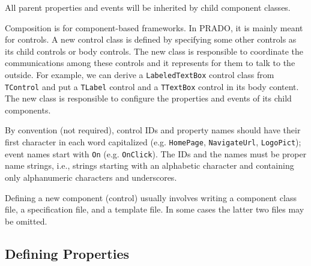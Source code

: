\documentclass{book}
\begin{document}
All parent properties and events will be inherited by child
component classes.


Composition is for component-based frameworks. In PRADO, it is
mainly meant for controls. A new control class is defined by
specifying some other controls as its child controls or body
controls. The new class is responsible to coordinate the
communications among these controls and it represents for them to
talk to the outside. For example, we can derive a
\verb|LabeledTextBox| control class from \verb|TControl| and put a
\verb|TLabel| control and a \verb|TTextBox| control in its body
content. The new class is responsible to configure the properties
and events of its child components.


By convention (not required), control IDs and property names
should have their first character in each word capitalized (e.g.
\verb|HomePage|, \verb|NavigateUrl|, \verb|LogoPict|); event names
start with \verb|On| (e.g. \verb|OnClick|). The IDs and the names
must be proper name strings, i.e., strings starting with an
alphabetic character and containing only alphanumeric characters
and underscores.


Defining a new component (control) usually involves writing a
component class file, a specification file, and a template file.
In some cases the latter two files may be omitted.


\subsection{Defining Properties}
\end{document}
